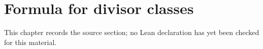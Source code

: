 \chapter{Formula for divisor classes}
\label{rigid-local-systems-multiplicative-eigenvalue-problem-chapter-06}

\begin{remark}
\label{rigid-local-systems-multiplicative-eigenvalue-problem-chapter-06-source}
This chapter records the source section; no Lean declaration has yet been checked for this material.
\notready
\end{remark}

